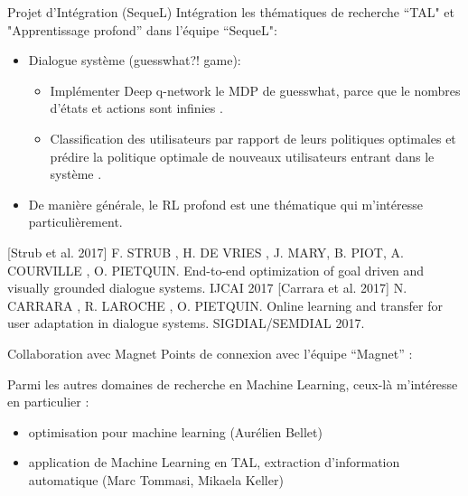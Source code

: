 \begin{frame}{Projet d'Intégration (SequeL)}
Intégration les thématiques de recherche ``TAL" et "Apprentissage profond” dans l'équipe ``SequeL":
\begin{block}{}
	\begin{itemize}
		\item Dialogue système (guesswhat?! game):
			\begin{itemize}
				\item Implémenter Deep q-network le MDP de guesswhat, parce que le nombres d'états et actions sont infinies \cite{strub}.
				\item Classification des utilisateurs par rapport de leurs politiques optimales et prédire la politique optimale de nouveaux utilisateurs entrant dans le système \cite{carrara}.  
			\end{itemize}
		\item De manière générale, le RL profond est une thématique qui m'intéresse particulièrement. 
	\end{itemize}
\end{block}

[Strub et al. 2017] F. STRUB , H. DE VRIES , J. MARY, B. PIOT, A. COURVILLE , O.
PIETQUIN. End-to-end optimization of goal driven and visually grounded dialogue
systems. IJCAI 2017
\vspace{0.2cm}
[Carrara et al. 2017] N. CARRARA , R. LAROCHE , O. PIETQUIN. Online learning and transfer for user adaptation in dialogue systems. SIGDIAL/SEMDIAL 2017.

\end{frame}

\begin{frame}{Collaboration avec Magnet}
Points de connexion avec l’équipe ``Magnet” :

\vspace{0.5cm}

Parmi les autres domaines de recherche en Machine Learning, ceux-là m'intéresse en particulier :

\begin{block}{}
\begin{itemize}
	\item optimisation pour machine learning (Aurélien Bellet)
	\item application de Machine Learning en TAL, extraction d'information automatique (Marc Tommasi, Mikaela Keller)
\end{itemize}
\end{block}

\end{frame}
